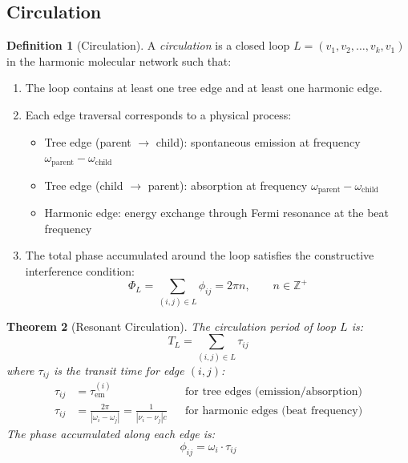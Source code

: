 \documentclass[11pt,a4paper]{article}
\newtheorem{theorem}{Theorem}[section]
\theoremstyle{definition}
\newtheorem{definition}[theorem]{Definition}
\theoremstyle{remark}
\newcommand{\Integer}{\mathbb{Z}}
\newcommand{\tem}{\tau_{\mathrm{em}}}
\begin{document}
\subsection{Circulation}

\begin{definition}[Circulation]
\label{def:circulation}
A \emph{circulation} is a closed loop $L = (v_1, v_2, \ldots, v_k, v_1)$ in the harmonic molecular network such that:
\begin{enumerate}[nosep]
\item The loop contains at least one tree edge and at least one harmonic edge.
\item Each edge traversal corresponds to a physical process:
\begin{itemize}[nosep]
\item Tree edge (parent $\to$ child): spontaneous emission at frequency $\omega_{\mathrm{parent}} - \omega_{\mathrm{child}}$
\item Tree edge (child $\to$ parent): absorption at frequency $\omega_{\mathrm{parent}} - \omega_{\mathrm{child}}$
\item Harmonic edge: energy exchange through Fermi resonance at the beat frequency
\end{itemize}
\item The total phase accumulated around the loop satisfies the constructive interference condition:
\begin{equation}
\Phi_L = \sum_{(i,j) \in L} \phi_{ij} = 2\pi n, \qquad n \in \Integer^+
\label{eq:constructive_interference}
\end{equation}
\end{enumerate}
\end{definition}

\begin{theorem}[Resonant Circulation]
\label{thm:resonant_circulation}
The circulation period of loop $L$ is:
\begin{equation}
T_L = \sum_{(i,j) \in L} \tau_{ij}
\label{eq:circulation_period}
\end{equation}
where $\tau_{ij}$ is the transit time for edge $(i,j)$:
\begin{align}
\tau_{ij} &= \tem^{(i)} && \text{for tree edges (emission/absorption)} \label{eq:tree_transit} \\
\tau_{ij} &= \frac{2\pi}{|\omega_i - \omega_j|} = \frac{1}{|\nu_i - \nu_j| c} && \text{for harmonic edges (beat frequency)} \label{eq:harmonic_transit}
\end{align}
The phase accumulated along each edge is:
\begin{equation}
\phi_{ij} = \omega_i \cdot \tau_{ij}
\label{eq:phase_per_edge}
\end{equation}
\end{theorem}
\end{document}
